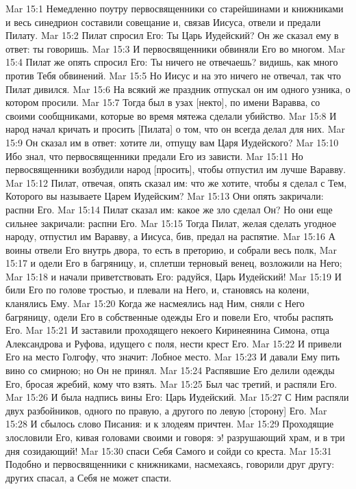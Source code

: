Mar 15:1  Немедленно поутру первосвященники со старейшинами и книжниками и весь синедрион составили совещание и, связав Иисуса, отвели и предали Пилату.
Mar 15:2  Пилат спросил Его: Ты Царь Иудейский? Он же сказал ему в ответ: ты говоришь.
Mar 15:3  И первосвященники обвиняли Его во многом.
Mar 15:4  Пилат же опять спросил Его: Ты ничего не отвечаешь? видишь, как много против Тебя обвинений.
Mar 15:5  Но Иисус и на это ничего не отвечал, так что Пилат дивился.
Mar 15:6  На всякий же праздник отпускал он им одного узника, о котором просили.
Mar 15:7  Тогда был в узах [некто], по имени Варавва, со своими сообщниками, которые во время мятежа сделали убийство.
Mar 15:8  И народ начал кричать и просить [Пилата] о том, что он всегда делал для них.
Mar 15:9  Он сказал им в ответ: хотите ли, отпущу вам Царя Иудейского?
Mar 15:10  Ибо знал, что первосвященники предали Его из зависти.
Mar 15:11  Но первосвященники возбудили народ [просить], чтобы отпустил им лучше Варавву.
Mar 15:12  Пилат, отвечая, опять сказал им: что же хотите, чтобы я сделал с Тем, Которого вы называете Царем Иудейским?
Mar 15:13  Они опять закричали: распни Его.
Mar 15:14  Пилат сказал им: какое же зло сделал Он? Но они еще сильнее закричали: распни Его.
Mar 15:15  Тогда Пилат, желая сделать угодное народу, отпустил им Варавву, а Иисуса, бив, предал на распятие.
Mar 15:16  А воины отвели Его внутрь двора, то есть в преторию, и собрали весь полк,
Mar 15:17  и одели Его в багряницу, и, сплетши терновый венец, возложили на Него;
Mar 15:18  и начали приветствовать Его: радуйся, Царь Иудейский!
Mar 15:19  И били Его по голове тростью, и плевали на Него, и, становясь на колени, кланялись Ему.
Mar 15:20  Когда же насмеялись над Ним, сняли с Него багряницу, одели Его в собственные одежды Его и повели Его, чтобы распять Его.
Mar 15:21  И заставили проходящего некоего Киринеянина Симона, отца Александрова и Руфова, идущего с поля, нести крест Его.
Mar 15:22  И привели Его на место Голгофу, что значит: Лобное место.
Mar 15:23  И давали Ему пить вино со смирною; но Он не принял.
Mar 15:24  Распявшие Его делили одежды Его, бросая жребий, кому что взять.
Mar 15:25  Был час третий, и распяли Его.
Mar 15:26  И была надпись вины Его: Царь Иудейский.
Mar 15:27  С Ним распяли двух разбойников, одного по правую, а другого по левую [сторону] Его.
Mar 15:28  И сбылось слово Писания: и к злодеям причтен.
Mar 15:29  Проходящие злословили Его, кивая головами своими и говоря: э! разрушающий храм, и в три дня созидающий!
Mar 15:30  спаси Себя Самого и сойди со креста.
Mar 15:31  Подобно и первосвященники с книжниками, насмехаясь, говорили друг другу: других спасал, а Себя не может спасти.
